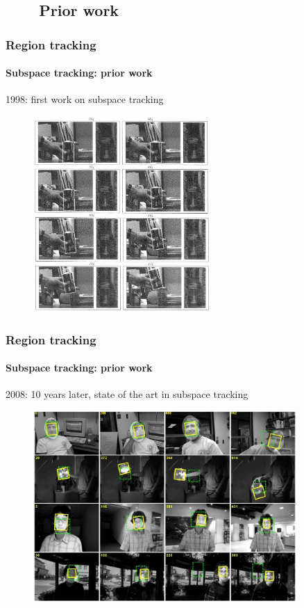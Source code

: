 \subsection{\ \ \ \ Prior work}

\begin{frame}
\frametitle{Region tracking}
\framesubtitle{Subspace tracking: prior work}
\mypagenum{}
\vspace{0.1in}
1998: first work on subspace tracking
	\begin{figure}
		\includegraphics[width=0.6\textwidth]{thesis/TrackingPapers_SubspaceTracking_1998_Black_fig9.png}
	\end{figure}
\end{frame}


\begin{frame}
\frametitle{Region tracking}
\framesubtitle{Subspace tracking: prior work}
\logoCSIPCPL\mypagenum
\vspace{0.1in}
2008: 10 years later, state of the art in subspace tracking
\begin{figure}
\includegraphics[width=0.9\textwidth]{thesis/TrackingPapers_SubspaceTracking_2008_Ross_fig10.png}
\end{figure}
\end{frame}





